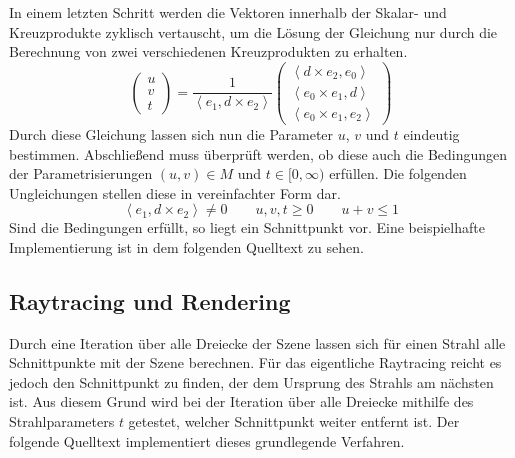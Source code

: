 \documentclass[crop=false]{standalone}
\begin{document}
      In einem letzten Schritt werden die Vektoren innerhalb der Skalar- und Kreuzprodukte zyklisch vertauscht, um die Lösung der Gleichung nur durch die Berechnung von zwei verschiedenen Kreuzprodukten zu erhalten.
      \[
        \begin{pmatrix}
          u \\
          v \\
          t
        \end{pmatrix}
        =
        \frac{1}{\left\langle e_1, d\times e_2  \right\rangle}
        \begin{pmatrix}
          \left\langle d\times e_2 , e_0 \right\rangle \\
          \left\langle e_0\times e_1 , d \right\rangle \\
          \left\langle e_0\times e_1, e_2 \right\rangle
        \end{pmatrix}
      \]
      Durch diese Gleichung lassen sich nun die Parameter $u$, $v$ und $t$ eindeutig bestimmen.
      Abschließend muss überprüft werden, ob diese auch die Bedingungen der Parametrisierungen $(u,v)\in M$ und $t\in [0,\infty)$ erfüllen.
      Die folgenden Ungleichungen stellen diese in vereinfachter Form dar.
      \[
        \left\langle e_1, d\times e_2  \right\rangle \neq 0
        \qquad
        u,v,t \geq 0
        \qquad
        u+v\leq 1
      \]
      Sind die Bedingungen erfüllt, so liegt ein Schnittpunkt vor.
      Eine beispielhafte Implementierung ist in dem folgenden Quelltext zu sehen.


    \subsection{Raytracing und Rendering} %
    \label{sub:raytracing_und_rendering}
      Durch eine Iteration über alle Dreiecke der Szene lassen sich für einen Strahl alle Schnittpunkte mit der Szene berechnen.
      Für das eigentliche Raytracing reicht es jedoch den Schnittpunkt zu finden, der dem Ursprung des Strahls am nächsten ist.
      Aus diesem Grund wird bei der Iteration über alle Dreiecke mithilfe des Strahlparameters $t$ getestet, welcher Schnittpunkt weiter entfernt ist.
      Der folgende Quelltext implementiert dieses grundlegende Verfahren.

\end{document}
